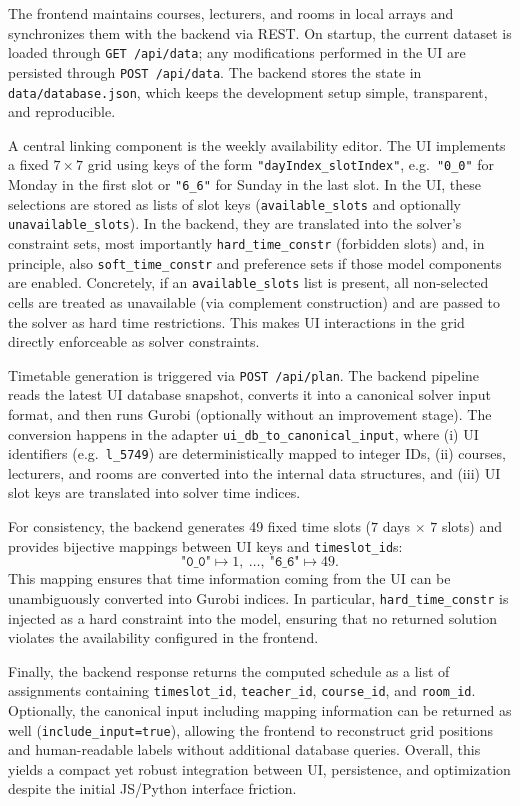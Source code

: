 \documentclass[11pt,a4paper]{article}
\begin{document}
The frontend maintains courses, lecturers, and rooms in local arrays and synchronizes them with the backend via REST. On startup, the current dataset is loaded through \texttt{GET /api/data}; any modifications performed in the UI are persisted through \texttt{POST /api/data}. The backend stores the state in \texttt{data/database.json}, which keeps the development setup simple, transparent, and reproducible.

A central linking component is the weekly availability editor. The UI implements a fixed $7\times7$ grid using keys of the form \texttt{"dayIndex\_slotIndex"}, e.g.\ \texttt{"0\_0"} for Monday in the first slot or \texttt{"6\_6"} for Sunday in the last slot. In the UI, these selections are stored as lists of slot keys (\texttt{available\_slots} and optionally \texttt{unavailable\_slots}). In the backend, they are translated into the solver's constraint sets, most importantly \texttt{hard\_time\_constr} (forbidden slots) and, in principle, also \texttt{soft\_time\_constr} and preference sets if those model components are enabled. Concretely, if an \texttt{available\_slots} list is present, all non-selected cells are treated as unavailable (via complement construction) and are passed to the solver as hard time restrictions. This makes UI interactions in the grid directly enforceable as solver constraints.

Timetable generation is triggered via \texttt{POST /api/plan}. The backend pipeline reads the latest UI database snapshot, converts it into a canonical solver input format, and then runs Gurobi (optionally without an improvement stage). The conversion happens in the adapter \texttt{ui\_db\_to\_canonical\_input}, where (i) UI identifiers (e.g.\ \texttt{l\_5749}) are deterministically mapped to integer IDs, (ii) courses, lecturers, and rooms are converted into the internal data structures, and (iii) UI slot keys are translated into solver time indices.

For consistency, the backend generates 49 fixed time slots ($7$ days $\times$ $7$ slots) and provides bijective mappings between UI keys and \texttt{timeslot\_id}s:
\[
\texttt{"0\_0"} \mapsto 1,\ \ldots,\ \texttt{"6\_6"} \mapsto 49.
\]
This mapping ensures that time information coming from the UI can be unambiguously converted into Gurobi indices. In particular, \texttt{hard\_time\_constr} is injected as a hard constraint into the model, ensuring that no returned solution violates the availability configured in the frontend.

Finally, the backend response returns the computed schedule as a list of assignments containing \texttt{timeslot\_id}, \texttt{teacher\_id}, \texttt{course\_id}, and \texttt{room\_id}. Optionally, the canonical input including mapping information can be returned as well (\texttt{include\_input=true}), allowing the frontend to reconstruct grid positions and human-readable labels without additional database queries. Overall, this yields a compact yet robust integration between UI, persistence, and optimization despite the initial JS/Python interface friction.
\end{document}
